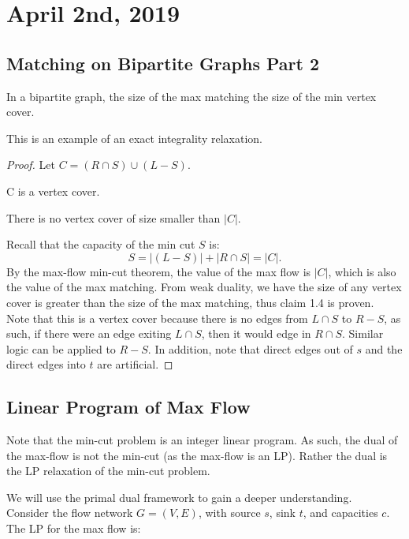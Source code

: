 \documentclass[../main/main.tex]{subfiles}
\begin{document}
\section{April  2nd, 2019}
\subsection{Matching on Bipartite Graphs Part 2}
\begin{theorem}
	In a bipartite graph, the size of the max matching  the size of the min vertex cover.
\end{theorem}
\begin{remark}
	This is an example of an exact integrality relaxation.
\end{remark}
\begin{proof}
	Let $C=(R \cap S) \cup (L-S)$.
	\begin{claim}
	C is a vertex cover.
	\end{claim}
	\begin{claim}
There is no vertex cover of size smaller than $|C|$.
	\end{claim}
	Recall that the capacity of the min cut $S$ is: \[
		S=|(L-S)|+|R\cap S|=|C|
	.\] By the max-flow min-cut theorem, the value of the max flow is $|C|$, which is also the value of the max matching. From weak duality, we have the size of any vertex cover is greater than the size of the max matching, thus claim 1.4 is proven. \\

	Note that this is a vertex cover because there is no edges from $L \cap S$ to $R-S$, as such, if there were an edge exiting  $L \cap  S$, then it would edge in $R\cap S$. Similar logic can be applied to $R-S$. In addition, note that direct edges out of $s$ and the direct edges into $t$ are artificial.
\end{proof}
\subsection{Linear Program of Max Flow}
\begin{remark}
	Note that the min-cut problem is an integer linear program. As such, the dual of the max-flow is not the min-cut (as the max-flow is an LP). Rather the dual is the LP relaxation of the min-cut problem.
\end{remark}
We will use the primal dual framework to gain a deeper understanding.\\

Consider the flow network $G=(V,E)$, with source $s$, sink $t$, and capacities $c$. The LP for the max flow is:\\
\end{document}
